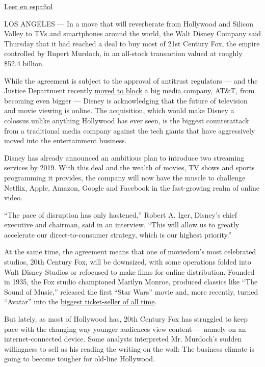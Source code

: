 \href{https://www.nytimes3xbfgragh.onion/es/2017/12/14/disney-adquisicion-21st-century-fox/}{Leer
en español}

LOS ANGELES --- In a move that will reverberate from Hollywood and
Silicon Valley to TVs and smartphones around the world, the Walt Disney
Company said Thursday that it had reached a deal to buy most of 21st
Century Fox, the empire controlled by Rupert Murdoch, in an all-stock
transaction valued at roughly \$52.4 billion.

While the agreement is subject to the approval of antitrust regulators
--- and the Justice Department recently
\href{https://www.nytimes3xbfgragh.onion/2017/11/20/business/dealbook/att-time-warner-merger.html?_r=0}{moved
to block} a big media company, AT\&T, from becoming even bigger ---
Disney is acknowledging that the future of television and movie viewing
is online. The acquisition, which would make Disney a colossus unlike
anything Hollywood has ever seen, is the biggest counterattack from a
traditional media company against the tech giants that have aggressively
moved into the entertainment business.

Disney has already announced an ambitious plan to introduce two
streaming services by 2019. With this deal and the wealth of movies, TV
shows and sports programming it provides, the company will now have the
muscle to challenge Netflix, Apple, Amazon, Google and Facebook in the
fast-growing realm of online video.

``The pace of disruption has only hastened,'' Robert A. Iger, Disney's
chief executive and chairman, said in an interview. ``This will allow us
to greatly accelerate our direct-to-consumer strategy, which is our
highest priority.''

At the same time, the agreement means that one of moviedom's most
celebrated studios, 20th Century Fox, will be downsized, with some
operations folded into Walt Disney Studios or refocused to make films
for online distribution. Founded in 1935, the Fox studio championed
Marilyn Monroe, produced classics like ``The Sound of Music,'' released
the first ``Star Wars'' movie and, more recently, turned ``Avatar'' into
the \href{http://www.boxofficemojo.com/alltime/world/}{biggest
ticket-seller of all time}.

But lately, as most of Hollywood has, 20th Century Fox has struggled to
keep pace with the changing way younger audiences view content ---
namely on an internet-connected device. Some analysts interpreted Mr.
Murdoch's sudden willingness to sell as his reading the writing on the
wall: The business climate is going to become tougher for old-line
Hollywood.

